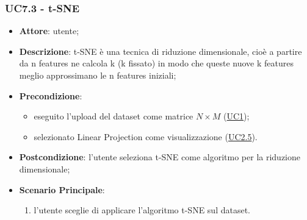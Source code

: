     \subsubsection{UC7.3 - t-SNE}
    \label{uc7.3}
    \begin{itemize}
    \item \textbf{Attore}: utente;
    \item \textbf{Descrizione}: t-SNE è una tecnica di riduzione dimensionale, cioè a partire da n features ne calcola k (k fissato) in modo che queste nuove k features meglio approssimano le n features iniziali;
    \item \textbf{Precondizione}: 
    \begin{itemize}
        \item eseguito l'upload del dataset come matrice $N\times M$ (\hyperref[uc1]{UC1});
        \item selezionato Linear Projection come visualizzazione (\hyperref[uc2.5]{UC2.5}).
    \end{itemize}  
    \item \textbf{Postcondizione}: l'utente seleziona t-SNE come algoritmo per la riduzione dimensionale;
    \item \textbf{Scenario Principale}: 
    \begin{enumerate}
        \item l'utente sceglie di applicare l'algoritmo t-SNE sul dataset.
    \end{enumerate}
    \end{itemize}
    
    